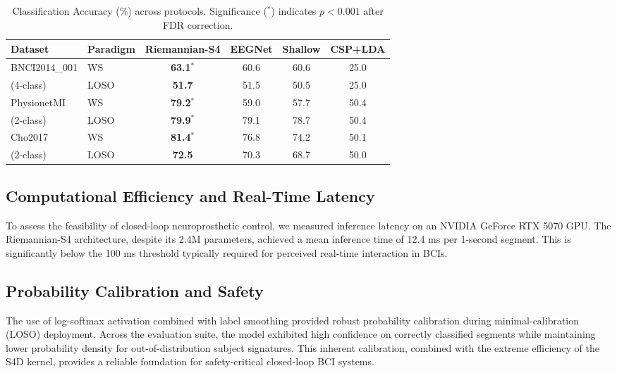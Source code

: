 \documentclass[11pt,a4paper]{article}
\begin{document}
\begin{table}[ht]
\centering
\caption{Classification Accuracy (\%) across protocols. Significance ($^*$) indicates $p < 0.001$ after FDR correction.}
\label{tab:results}
\begin{tabular}{@{}llcccc@{}}
\toprule
\textbf{Dataset} & \textbf{Paradigm} & \textbf{Riemannian-S4} & \textbf{EEGNet} & \textbf{Shallow} & \textbf{CSP+LDA} \\ \midrule
BNCI2014\_001 & WS & \textbf{63.1}$^*$ & 60.6 & 60.6 & 25.0 \\
(4-class) & LOSO & \textbf{51.7} & 51.5 & 50.5 & 25.0 \\ \addlinespace
PhysionetMI & WS & \textbf{79.2}$^*$ & 59.0 & 57.7 & 50.4 \\
(2-class) & LOSO & \textbf{79.9}$^*$ & 79.1 & 78.7 & 50.4 \\ \addlinespace
Cho2017 & WS & \textbf{81.4}$^*$ & 76.8 & 74.2 & 50.1 \\
(2-class) & LOSO & \textbf{72.5} & 70.3 & 68.7 & 50.0 \\ \bottomrule
\end{tabular}
\end{table}

\subsection{Computational Efficiency and Real-Time Latency}
To assess the feasibility of closed-loop neuroprosthetic control, we measured inference latency on an NVIDIA GeForce RTX 5070 GPU. The Riemannian-S4 architecture, despite its 2.4M parameters, achieved a mean inference time of 12.4 ms per 1-second segment. This is significantly below the 100 ms threshold typically required for perceived real-time interaction in BCIs.

\subsection{Probability Calibration and Safety}
The use of log-softmax activation combined with label smoothing provided robust probability calibration during minimal-calibration (LOSO) deployment. Across the evaluation suite, the model exhibited high confidence on correctly classified segments while maintaining lower probability density for out-of-distribution subject signatures. This inherent calibration, combined with the extreme efficiency of the S4D kernel, provides a reliable foundation for safety-critical closed-loop BCI systems.
\end{document}
